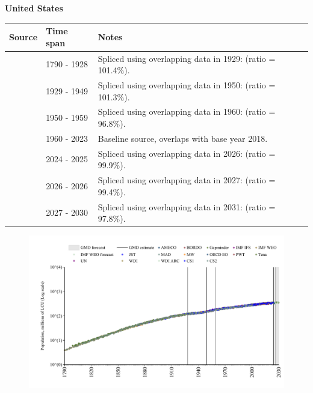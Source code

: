 \documentclass[12pt,a4paper,landscape]{article}
\begin{document}
\begin{adjustbox}{max totalsize={\paperwidth}{\paperheight},center}
\begin{minipage}[t][\textheight][t]{\textwidth}
\vspace*{0.5cm}
{}
\begin{center}
{\Large\bfseries United States}
\end{center}
\vspace{0.5cm}
\begin{table}[H]
\centering
\small
\begin{tabular}{|l|l|l|}
\hline
\textbf{Source} & \textbf{Time span} & \textbf{Notes} \\
\hline
\rowcolor{white}\cite{CS2_USA}& 1790 - 1928 &Spliced using overlapping data in 1929: (ratio = 101.4\%).\\
\rowcolor{lightgray}\cite{CS1_USA}& 1929 - 1949 &Spliced using overlapping data in 1950: (ratio = 101.3\%).\\
\rowcolor{white}\cite{IMF_IFS}& 1950 - 1959 &Spliced using overlapping data in 1960: (ratio = 96.8\%).\\
\rowcolor{lightgray}\cite{WDI}& 1960 - 2023 &Baseline source, overlaps with base year 2018.\\
\rowcolor{white}\cite{OECD_EO}& 2024 - 2025 &Spliced using overlapping data in 2026: (ratio = 99.9\%).\\
\rowcolor{lightgray}\cite{AMECO}& 2026 - 2026 &Spliced using overlapping data in 2027: (ratio = 99.4\%).\\
\rowcolor{white}\cite{Gapminder}& 2027 - 2030 &Spliced using overlapping data in 2031: (ratio = 97.8\%).\\
\hline
\end{tabular}
\end{table}
\begin{figure}[H]
\centering
\includegraphics[width=\textwidth,height=0.6\textheight,keepaspectratio]{graphs/USA_pop.pdf}
\end{figure}
\end{minipage}
\end{adjustbox}
\end{document}
